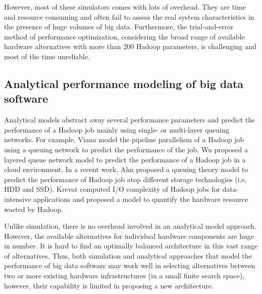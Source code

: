 \documentclass[journal]{IEEEtran}
\begin{document}
However, most of these simulators comes with lots of overhead. They are time and resource consuming and often fail to assess the real system characteristics in the presence of huge volumes of big data. Furthermore, the trial-and-error method of performance optimization, considering the broad range of available hardware alternatives with more than $200$ Hadoop parameters, is challenging and most of the time unreliable.

\subsection{Analytical performance modeling of big data software}
Analytical models abstract away several performance parameters and predict the performance of a Hadoop job mainly using single- or multi-layer queuing networks. For example, Viana \cite{Model:vianna2013analytical} model the pipeline parallelism of a Hadoop job using a queuing network to predict the performance of the job.  Wu \cite{Model:wu2015exploring} proposed a layered queue network model to predict the performance of a Hadoop job in a cloud environment. In a recent work, Ahn \cite{Model:ahn2015analytical} proposed a queuing theory model to predict the performance of Hadoop job atop different storage technologies (i.e, HDD and SSD). Krevat \cite{Model:krevat2010applying} computed I/O complexity of Hadoop jobs for data-intensive applications and proposed a model to quantify the hardware resource wasted by Hadoop. 

Unlike simulation, there is no overhead involved in an analytical model approach. However, the available  alternatives for individual hardware components are huge in number. It is hard to find an optimally balanced architecture in this vast range of alternatives. Thus,  both simulation and analytical approaches that model the performance of big data software may work well in selecting alternatives between two or more existing hardware infrastructures (in a small finite search space), however, their capability is limited in proposing a new architecture.
\end{document}
